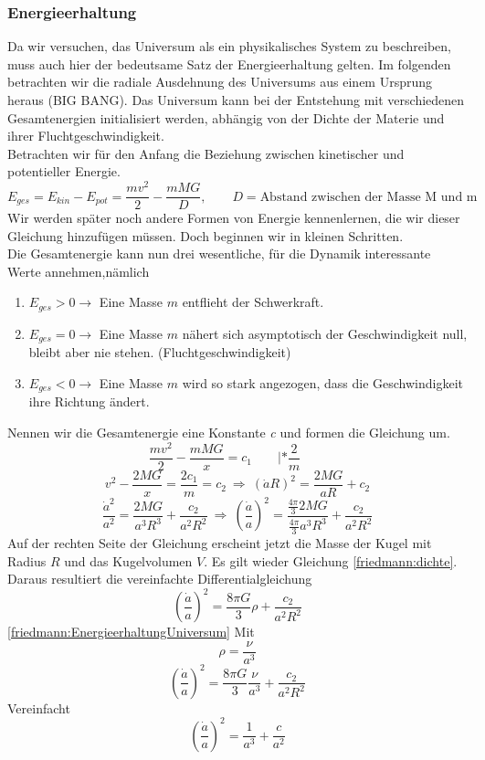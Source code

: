 \begin{refsection}
\subsubsection{Energieerhaltung}
Da wir versuchen, das Universum als ein physikalisches System zu beschreiben, muss auch hier der bedeutsame Satz der Energieerhaltung gelten. Im folgenden betrachten wir die radiale Ausdehnung des Universums aus einem Ursprung heraus (BIG BANG). Das Universum kann bei der Entstehung mit verschiedenen Gesamtenergien initialisiert werden, abhängig von der Dichte der Materie und ihrer Fluchtgeschwindigkeit.\\
Betrachten wir für den Anfang die Beziehung zwischen kinetischer und potentieller Energie.
\begin{equation}
E_{ges} = E_{kin} - E_{pot} =  \frac{m v^2}{2} - \frac{m M G }{D}, \qquad D = \text{Abstand zwischen der Masse M und m}
\end{equation}
Wir werden später noch andere Formen von Energie kennenlernen, die wir dieser Gleichung hinzufügen müssen. Doch beginnen wir in kleinen Schritten.\\
Die Gesamtenergie kann nun drei wesentliche, für die Dynamik interessante Werte annehmen,nämlich
\begin{enumerate}
	\item $E_{ges} > 0 \rightarrow$ Eine Masse $m$ entflieht der Schwerkraft.
	\item $E_{ges} = 0 \rightarrow$ Eine Masse $m$ nähert sich asymptotisch  der Geschwindigkeit null, bleibt aber nie stehen. (Fluchtgeschwindigkeit)
	\item $E_{ges} < 0 \rightarrow$ Eine Masse $m$ wird so stark angezogen, dass die Geschwindigkeit ihre Richtung ändert.
\end{enumerate}
Nennen wir die Gesamtenergie eine Konstante \textit{c} und formen die Gleichung um.
\[\frac{m v^2}{2} - \frac{m M G}{x} = c_1 \qquad| *\frac{2}{m} \qquad \]
\[{v^2} - \frac{2 M G}{x} = \frac{2c_1}{m} = c_2
\:  \Rightarrow \: \left( \dot{a} R\right)^2 = \frac{2 M G}{a R} + c_2\] 
\[\frac{\dot{a}^2}{a^2} = \frac{2 M G}{a^3 R^3} + \frac{c_2}{a^2 R^2} \: \Rightarrow \: \left(\frac{\dot{a}}{a} \right)^2 = \frac{\frac{4 \pi}{3}2 M G}{\frac{4 \pi}{3} a^3 R^3} + \frac{c_2}{a^2 R^2} \] %
Auf der rechten Seite der Gleichung erscheint jetzt die Masse der Kugel mit Radius $R$ und das Kugelvolumen $V$. Es gilt wieder Gleichung \ref{friedmann:dichte}. Daraus resultiert die vereinfachte Differentialgleichung 
\begin{equation}
\left(\frac{\dot{a}}{a} \right)^2 = \frac{8 \pi G}{3} \rho + \frac{c_2}{a^2 R^2}
\label{friedmann:EnergieerhaltungUniversum}
\end{equation}
\ref{friedmann:EnergieerhaltungUniversum}
Mit \[\rho = \frac{\nu}{a^3}\]
\[
\left(\frac{\dot{a}}{a} \right)^2 = \frac{8 \pi G}{3} \frac{\nu}{a^3} + \frac{c_2}{a^2 R^2}
\]
Vereinfacht
\begin{equation}
\left(\frac{\dot{a}}{a} \right)^2 = \frac{1}{a^3} + \frac{c}{a^2}
\end{equation}


\end{refsection}
